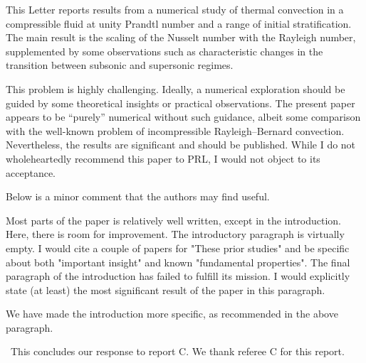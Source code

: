 \documentclass[aps, 11pt, singlecolumn]{revtex4-1} %
\begin{document}
\begin{singlespace}
\begin{myquotation}
This Letter reports results from a numerical study of thermal
convection in a compressible fluid at unity Prandtl number and a range
of initial stratification. The main result is the scaling of the
Nusselt number with the Rayleigh number, supplemented by some
observations such as characteristic changes in the transition between
subsonic and supersonic regimes.

This problem is highly challenging. Ideally, a numerical exploration
should be guided by some theoretical insights or practical
observations. The present paper appears to be ``purely'' numerical
without such guidance, albeit some comparison with the well-known
problem of incompressible Rayleigh--Bernard convection. Nevertheless,
the results are significant and should be published. While I do not
wholeheartedly recommend this paper to PRL, I would not object to its
acceptance.

Below is a minor comment that the authors may find useful.

Most parts of the paper is relatively well written, except in the
introduction. Here, there is room for improvement. The introductory
paragraph is virtually empty. I would cite a couple of papers for
"These prior studies" and be specific about both "important insight"
and known "fundamental properties". The final paragraph of the
introduction has failed to fulfill its mission. I would explicitly
state (at least) the most significant result of the paper in this
paragraph.
\end{myquotation}
We have made the introduction more specific, as recommended in the above paragraph.

$\,$\newline\noindent
This concludes our response to report C.  We thank referee C for this report.

$\,$
\newline
\noindent


\end{singlespace}





\end{document}

